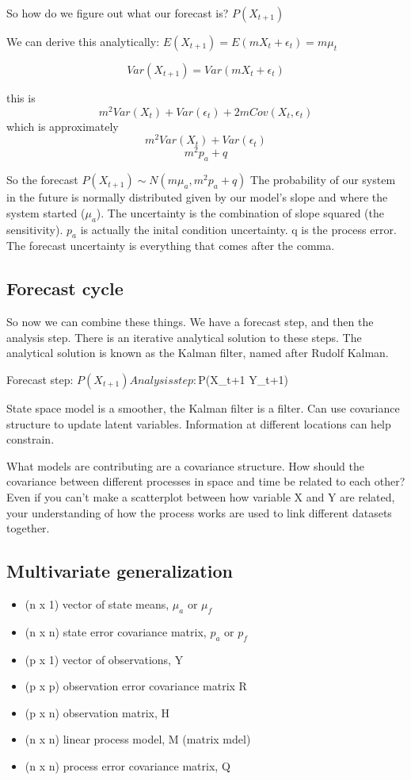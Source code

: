 \documentclass[12pt, oneside]{article}   	%
\begin{document}
So how do we figure out what our forecast is? $P(X_{t+1})$

We can derive this analytically: $E(X_{t+1}) = E(mX_t + \epsilon_t) = m\mu_t$

$$Var(X_{t+1}) = Var(mX_t + \epsilon_t)$$

this is 
$$m^2Var(X_t) + Var(\epsilon_t) + 2mCov(X_t,\epsilon_t)$$ 
which is approximately 
$$m^2Var(X_t) + Var(\epsilon_t) $$ 
$$m^2 p_a + q $$ 

So the forecast $P(X_{t+1}) \sim N(m \mu_a, m^2 p_a + q)$ The probability of our system in the future is normally distributed given by our model's slope and where the system started ($\mu_a$). The uncertainty is the combination of slope squared (the sensitivity). $p_a$ is actually the inital condition uncertainty. q is the process error. The forecast uncertainty is everything that comes after the comma.

\subsection{Forecast cycle}

So now we can combine these things. We have a forecast step, and then the analysis step. There is an iterative analytical solution to these steps. The analytical solution is known as the Kalman filter, named after Rudolf Kalman.

Forecast step: $P(X_{t+1})

Analysis step: $P(X_{t+1} \mid Y_{t+1})

State space model is a smoother, the Kalman filter is a filter. Can use covariance structure to update latent variables. Information at different locations can help constrain.

What models are contributing are a covariance structure. How should the covariance between different processes in space and time be related to each other? Even if you can't make a scatterplot between how variable X and Y are related, your understanding of how the process works are used to link different datasets together.

\subsection{Multivariate generalization}

\begin{itemize}
\item (n x 1) vector of state means, $\mu_a$ or $\mu_f$
\item (n x n) state error covariance matrix, $p_a$ or $p_f$
\item (p x 1) vector of observations, Y
\item (p x p) observation error covariance matrix R
\item (p x n) observation matrix, H
\item (n x n) linear process model, M (matrix mdel)
\item (n x n) process error covariance matrix, Q
\end{itemize}
\end{document}
